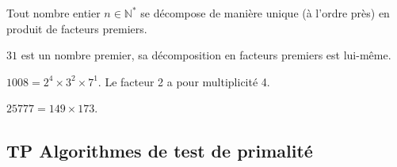 \begin{theorem}  Tout nombre entier $n\in\mathbb{N}^*$ se décompose de manière unique (à l'ordre près) en produit de  facteurs premiers.
\end{theorem}
\begin{example}
	$31$ est un nombre premier, sa décomposition en facteurs premiers est lui-même.
	
	$1008=2^4\times 3^2 \times 7^1$. Le facteur 2 a pour multiplicité 4.
	
	$25777=149\times 173$.
\end{example} 

\newpage 
{}  
\pagestyle{scrheadings} %
\onehalfspacing


\subsection{TP Algorithmes de test de primalité} \label{chap03:exo:python:premier01}

